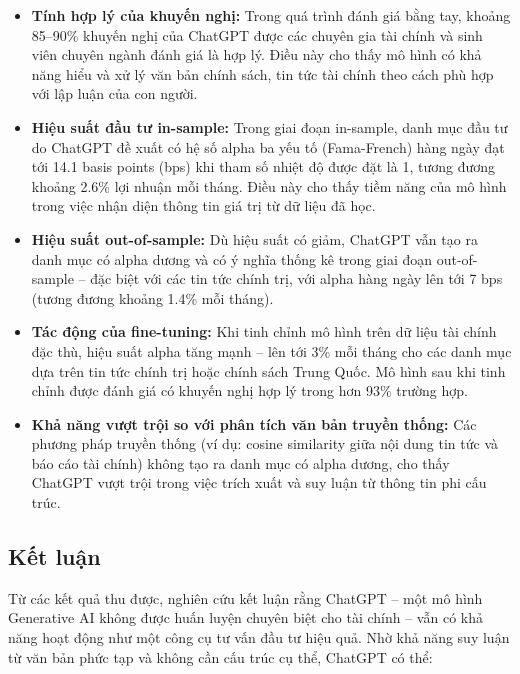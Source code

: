 \documentclass[a4paper,12pt]{article}
\begin{document}
\begin{itemize}
    \item \textbf{Tính hợp lý của khuyến nghị:} Trong quá trình đánh giá bằng tay, khoảng 85–90\% khuyến nghị của ChatGPT được các chuyên gia tài chính và sinh viên chuyên ngành đánh giá là hợp lý. Điều này cho thấy mô hình có khả năng hiểu và xử lý văn bản chính sách, tin tức tài chính theo cách phù hợp với lập luận của con người.
    
    \item \textbf{Hiệu suất đầu tư in-sample:} Trong giai đoạn in-sample, danh mục đầu tư do ChatGPT đề xuất có hệ số alpha ba yếu tố (Fama-French) hàng ngày đạt tới 14.1 basis points (bps) khi tham số nhiệt độ được đặt là 1, tương đương khoảng 2.6\% lợi nhuận mỗi tháng. Điều này cho thấy tiềm năng của mô hình trong việc nhận diện thông tin giá trị từ dữ liệu đã học.

    \item \textbf{Hiệu suất out-of-sample:} Dù hiệu suất có giảm, ChatGPT vẫn tạo ra danh mục có alpha dương và có ý nghĩa thống kê trong giai đoạn out-of-sample – đặc biệt với các tin tức chính trị, với alpha hàng ngày lên tới 7 bps (tương đương khoảng 1.4\% mỗi tháng).

    \item \textbf{Tác động của fine-tuning:} Khi tinh chỉnh mô hình trên dữ liệu tài chính đặc thù, hiệu suất alpha tăng mạnh – lên tới 3\% mỗi tháng cho các danh mục dựa trên tin tức chính trị hoặc chính sách Trung Quốc. Mô hình sau khi tinh chỉnh được đánh giá có khuyến nghị hợp lý trong hơn 93\% trường hợp.

    \item \textbf{Khả năng vượt trội so với phân tích văn bản truyền thống:} Các phương pháp truyền thống (ví dụ: cosine similarity giữa nội dung tin tức và báo cáo tài chính) không tạo ra danh mục có alpha dương, cho thấy ChatGPT vượt trội trong việc trích xuất và suy luận từ thông tin phi cấu trúc.
\end{itemize}

\subsection{Kết luận}

Từ các kết quả thu được, nghiên cứu kết luận rằng ChatGPT – một mô hình Generative AI không được huấn luyện chuyên biệt cho tài chính – vẫn có khả năng hoạt động như một công cụ tư vấn đầu tư hiệu quả. Nhờ khả năng suy luận từ văn bản phức tạp và không cần cấu trúc cụ thể, ChatGPT có thể:
\end{document}
